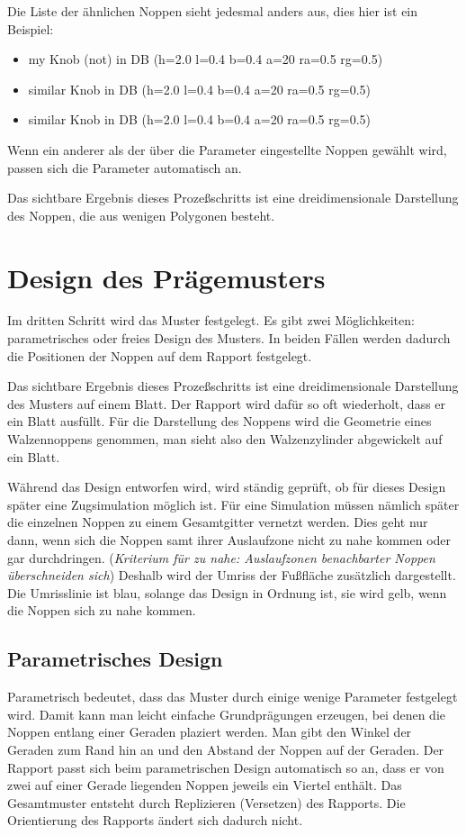 Die Liste der \"ahnlichen Noppen sieht jedesmal anders aus, dies
hier ist ein Beispiel:
\begin{itemize}
\item my Knob (not) in DB (h=2.0 l=0.4 b=0.4 a=20 ra=0.5 rg=0.5)
\item similar Knob in DB (h=2.0 l=0.4 b=0.4 a=20 ra=0.5 rg=0.5)
\item similar Knob in DB (h=2.0 l=0.4 b=0.4 a=20 ra=0.5 rg=0.5)
\end{itemize}


Wenn ein anderer als der \"uber die Parameter eingestellte Noppen
gew\"ahlt wird, passen sich die Parameter automatisch an.

Das sichtbare Ergebnis dieses Proze\ss schritts ist eine dreidimensionale
Darstellung des Noppen, die aus wenigen Polygonen besteht. 

\section{Design des Pr\"agemusters}
Im dritten Schritt wird das Muster festgelegt. Es gibt zwei M\"oglichkeiten:
parametrisches oder freies Design des Musters. In beiden F\"allen werden
dadurch die Positionen der Noppen auf dem Rapport festgelegt.

Das sichtbare Ergebnis dieses Proze\ss schritts ist eine dreidimensionale
Darstellung des Musters auf einem Blatt. Der Rapport wird daf\"ur so oft 
wiederholt, dass er ein Blatt ausf\"ullt. F\"ur die Darstellung des Noppens
wird die Geometrie eines Walzennoppens genommen, man sieht also den
Walzenzylinder abgewickelt auf ein Blatt.

W\"ahrend das Design entworfen wird, wird st\"andig
gepr\"uft, ob f\"ur dieses Design sp\"ater eine Zugsimulation m\"oglich ist. 
F\"ur eine Simulation m\"ussen n\"amlich sp\"ater die einzelnen Noppen zu
einem Gesamtgitter vernetzt werden. Dies geht nur dann, wenn sich die
Noppen samt ihrer Auslaufzone nicht zu nahe kommen oder gar durchdringen. 
({\it Kriterium f\"ur zu nahe: Auslaufzonen benachbarter Noppen \"uberschneiden sich})
Deshalb wird der
Umriss der Fu\ss fl\"ache zus\"atzlich dargestellt. Die Umrisslinie
ist blau, solange das Design in Ordnung ist, sie wird gelb, wenn die
Noppen sich zu nahe kommen. 

\subsection{Parametrisches Design}
Parametrisch bedeutet, dass das Muster durch einige wenige Parameter 
festgelegt wird. Damit kann man leicht einfache Grundpr\"agungen erzeugen,
bei denen die Noppen entlang einer Geraden plaziert werden. Man gibt den
Winkel der Geraden zum Rand hin an und den Abstand der Noppen auf der Geraden.
Der Rapport passt sich beim parametrischen Design automatisch so an, dass
er von zwei auf einer Gerade liegenden Noppen jeweils ein Viertel enth\"alt.
Das Gesamtmuster entsteht durch Replizieren (Versetzen) des Rapports. 
Die Orientierung des Rapports \"andert sich dadurch nicht.
 
